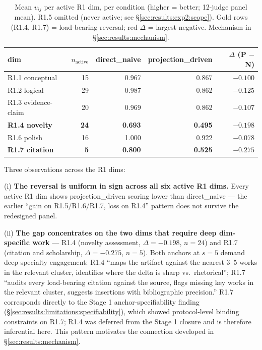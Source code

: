\begin{table}[!t]
\centering
\caption{Mean $v_{ij}$ per active R1 dim, per condition (higher = better; 12-judge panel mean). R1.5 omitted (never active; see \S\ref{sec:results:exp2:scope}). Gold rows (R1.4, R1.7) = load-bearing reversal; red $\Delta$ = largest negative. Mechanism in \S\ref{sec:results:mechanism}.}
\label{tab:exp2_by_dim}
\begin{tabular}{lrrrr}
\toprule
\textbf{dim} & $n_{\text{active}}$ & \textbf{direct\_naive} & \textbf{projection\_driven} & $\Delta$ (P $-$ N) \\
\midrule
R1.1 conceptual           & 15 & 0.967 & 0.867 & $-0.100$ \\
R1.2 logical              & 29 & 0.987 & 0.862 & \cellcolor{HMMid}$-0.125$ \\
R1.3 evidence-claim       & 20 & 0.969 & 0.862 & $-0.107$ \\
\rowcolor{HMHeadline}
\textbf{R1.4 novelty}     & \textbf{24} & \textbf{0.693} & \textbf{0.495} & \cellcolor{HMHigh}$\mathbf{-0.198}$ \\
R1.6 polish               & 16 & 1.000 & 0.922 & $-0.078$ \\
\rowcolor{HMHeadline}
\textbf{R1.7 citation}    & \textbf{5} & \textbf{0.800} & \textbf{0.525} & \cellcolor{HMHigh}$\mathbf{-0.275}$ \\
\bottomrule
\end{tabular}
\end{table}

Three observations across the R1 dims:

(i) \textbf{The reversal is uniform in sign across all six active R1 dims.} Every active R1 dim shows projection\_driven scoring lower than direct\_naive --- the earlier ``gain on R1.5/R1.6/R1.7, loss on R1.4'' pattern does not survive the redesigned panel.

(ii) \textbf{The gap concentrates on the two dims that require deep dim-specific work} --- R1.4 (novelty assessment, $\Delta = -0.198$, $n = 24$) and R1.7 (citation and scholarship, $\Delta = -0.275$, $n = 5$). Both anchors at $s = 5$ demand deep specialty engagement: R1.4 ``maps the artifact against the nearest 3--5 works in the relevant cluster, identifies where the delta is sharp vs.\ rhetorical''; R1.7 ``audits every load-bearing citation against the source, flags missing key works in the relevant cluster, suggests insertions with bibliographic precision.'' R1.7 corresponds directly to the Stage 1 anchor-specifiability finding (\S\ref{sec:results:limitations:specifiability}), which showed protocol-level binding constraints on R1.7; R1.4 was deferred from the Stage 1 closure and is therefore inferential here. This pattern motivates the connection developed in \S\ref{sec:results:mechanism}.

